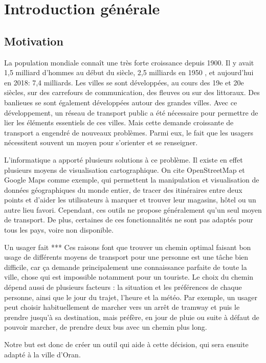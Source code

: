 \chapter{Introduction générale}
\newpage	
\section{Motivation}
La population mondiale connaît une très forte croissance depuis 1900. 
Il y avait 1,5 milliard d'hommes au début du siècle, 2,5 milliards en 1950 , et aujourd'hui en 2018: 7,4 milliards. 
Les villes se sont développées, au cours des 19e et 20e siècles, sur des carrefours de communication, des fleuves ou sur des littoraux. Des banlieues se sont également développées autour des grandes villes. 
Avec ce développement, un réseau de transport public a été nécessaire pour permettre de lier les éléments essentiels de ces villes. 
Mais cette demande croissante de transport a engendré de nouveaux problèmes. Parmi eux, le fait que les usagers nécessitent souvent un moyen pour s'orienter et se renseigner.

L'informatique a apporté plusieurs solutions à ce problème. Il existe en effet plusieurs moyens de visualisation cartographique.
On cite OpenStreetMap et Google Maps comme exemple, qui permettent la manipulation et visualisation de données géographiques du monde entier, de tracer des itinéraires entre deux points et d'aider les utilisateurs à marquer et trouver leur magasins, hôtel ou un autre lieu favori.
Cependant, ces outils ne propose généralement qu'un seul moyen de transport. De plus, certaines de ces fonctionnalités ne sont pas adaptés pour tous les pays, voire non disponible.

Un usager fait  ***
\newline
Ces raisons font que trouver un chemin optimal faisant bon usage de différents moyens de transport pour une personne est une tâche bien difficile, car ça demande principalement une connaissance parfaite de toute la ville, chose qui est impossible notamment pour un touriste.
Le choix du chemin dépend aussi de plusieurs facteurs : la situation et les préférences de chaque personne, ainsi que le jour du trajet, l'heure et la météo.
Par exemple, un usager peut choisir habituellement de marcher vers un arrêt de tramway et puis le prendre jusqu'à sa destination, mais préfère, en jour de pluie ou suite à défaut de pouvoir marcher, de prendre deux bus avec un chemin plus long.

Notre but est donc de créer un outil qui aide à cette décision, qui sera ensuite adapté à la ville d’Oran.

